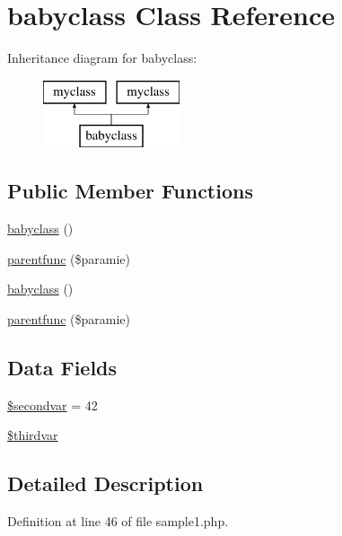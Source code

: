 \hypertarget{classbabyclass}{\section{babyclass \-Class \-Reference}
\label{classbabyclass}
}
\-Inheritance diagram for babyclass\-:\begin{figure}[H]
\begin{center}
\leavevmode
\includegraphics[height=2.000000cm]{classbabyclass}
\end{center}
\end{figure}
\subsection*{\-Public \-Member \-Functions}
\begin{DoxyCompactItemize}
\item 
\hyperlink{classbabyclass_a91ed4db867c4dc79f6b2597824f00a78}{babyclass} ()
\item 
\hyperlink{classbabyclass_ad9e59edf03f5373b1bb0738f45ece41d}{parentfunc} (\$paramie)
\item 
\hyperlink{classbabyclass_a91ed4db867c4dc79f6b2597824f00a78}{babyclass} ()
\item 
\hyperlink{classbabyclass_ad9e59edf03f5373b1bb0738f45ece41d}{parentfunc} (\$paramie)
\end{DoxyCompactItemize}
\subsection*{\-Data \-Fields}
\begin{DoxyCompactItemize}
\item 
\hyperlink{classbabyclass_a380d4f7424ae53505c6ce9bf5a39dffd}{\$secondvar} = 42
\item 
\hyperlink{classbabyclass_a472dcb5af91e6053c5ad74fd2a01c2fb}{\$thirdvar}
\end{DoxyCompactItemize}


\subsection{\-Detailed \-Description}


\-Definition at line 46 of file sample1.\-php.



